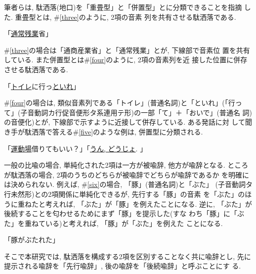 筆者らは, 駄洒落(地口)を「重畳型」と「併置型」とに分類できることを指摘
した\cite{Takizawa1992}. 重畳型とは, \#\ref{three}のように, 2項の音素
列を共有させる駄洒落である. 

\vspace*{1em}\begin{sample}
\item 「\underline{通常残業}省」\label{three}
\end{sample}\vspace*{1em}
\#\ref{three}の場合は「通商産業省」と「通常残業」とが, 下線部で音素位
置を共有している. また併置型とは\#\ref{four}のように, 2項の音素列を近
接した位置に併存させる駄洒落である.   

\vspace*{1em}\begin{sample}
\item 「\underline{トイレ}に行っ\underline{といれ}」\label{four}
\end{sample}\vspace*{1em}
\#\ref{four}の場合は, 類似音素列である「トイレ」(普通名詞)と「といれ」(「行っ
て」(子音動詞カ行促音便形タ系連用テ形)の一部「て」＋「おいで」(普通名
詞)の音便化)とが, 下線部で示すように近接して併存している. ある発話に対
して聞き手が駄洒落で答える\#\ref{five}のような例は, 併置型に分類される.  

\vspace*{1em}\begin{sample}
\item 「\underline{運動場}借りてもいい？」「\underline{うん, どうじょ}. 
」\label{five}
\end{sample}\vspace*{1em}

一般の比喩の場合, 単純化された2項は一方が被喩辞, 他方が喩辞となる. 
ところが駄洒落の場合, 2項のうちのどちらが被喩辞でどちらが喩辞であるか
を明確には決められない. 例えば, \#\ref{six}の場合, 「豚」(普通名詞)と「ぶた」
(子音動詞タ行未然形)との2項関係に単純化できるが, 先行する「豚」の音素
を「ぶた」のほうに重ねたと考えれば, 「ぶた」が「豚」を例えたことになる. 
逆に, 「ぶた」が後続することを匂わせるためにまず「豚」を提示した(すな
わち「豚」に「ぶた」を重ねている)と考えれば, 「豚」が「ぶた」を例えた
ことになる.  

\vspace*{1em}\begin{sample}
\item 「豚がぶたれた」\label{six}
\end{sample}\vspace*{1em}
そこで本研究では, 駄洒落を構成する2項を区別することなく共に喩辞とし, 
先に提示される喩辞を「先行喩辞」, 後の喩辞を「後続喩辞」と呼ぶことにす
る.  

